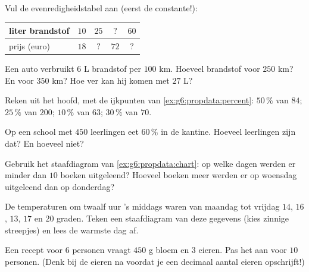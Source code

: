 \begin{exercise}[$\star$]\label{exo:g6:propdata:3}
Vul de evenredigheidstabel aan (eerst de constante!):
\begin{center}
\renewcommand{\arraystretch}{1.2}
\begin{tabular}{l|cccc}
liter brandstof & $10$ & $25$ & $?$ & $60$ \\
\hline
prijs (euro) & $18$ & $?$ & $72$ & $?$ \\
\end{tabular}
\end{center}
\end{exercise}

\begin{exercise}[$\star$]\label{exo:g6:propdata:4}
Een auto verbruikt $6$ L brandstof per $100$ km. Hoeveel brandstof voor $250$
km? En voor $350$ km? Hoe ver kan hij komen met $27$ L?
\end{exercise}

\begin{exercise}[$\star$]\label{exo:g6:propdata:5}
Reken uit het hoofd, met de ijkpunten van \cref{ex:g6:propdata:percent}:
$50\,\%$ van $84$; \quad $25\,\%$ van $200$; \quad $10\,\%$ van $63$; \quad
$30\,\%$ van $70$.
\end{exercise}

\begin{exercise}[$\star$]\label{exo:g6:propdata:6}
Op een school met $450$ leerlingen eet $60\,\%$ in de kantine. Hoeveel
leerlingen zijn dat? En hoeveel niet?
\end{exercise}

\begin{exercise}[$\star$]\label{exo:g6:propdata:7}
Gebruik het staafdiagram van \cref{ex:g6:propdata:chart}: op welke dagen werden
er minder dan $10$ boeken uitgeleend? Hoeveel boeken meer werden er op woensdag
uitgeleend dan op donderdag?
\end{exercise}

\begin{exercise}[$\star$]\label{exo:g6:propdata:8}
De temperaturen om twaalf uur 's middags waren van maandag tot vrijdag $14$,
$16$, $13$, $17$ en $20$ graden. Teken een staafdiagram van deze gegevens (kies
zinnige streepjes) en lees de warmste dag af.
\end{exercise}

\begin{exercise}[$\star\star$]\label{exo:g6:propdata:9}
Een recept voor $6$ personen vraagt $450$ g bloem en $3$ eieren. Pas het aan
voor $10$ personen. (Denk bij de eieren na voordat je een decimaal aantal eieren
opschrijft!)
\end{exercise}

